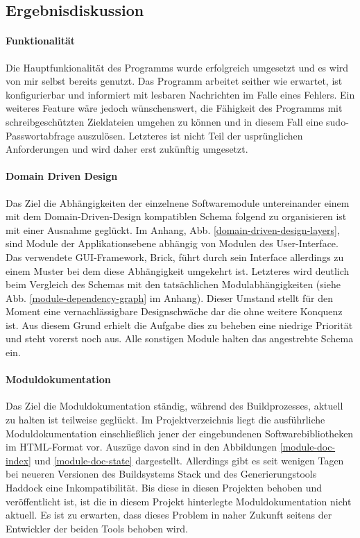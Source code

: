 \subsection{Ergebnisdiskussion}

\paragraph{Funktionalität}
Die Hauptfunkionalität des Programms wurde erfolgreich umgesetzt und es wird von
mir selbst bereits genutzt. Das Programm arbeitet seither wie erwartet,
ist konfigurierbar und informiert mit lesbaren Nachrichten im Falle eines Fehlers.
Ein weiteres Feature wäre jedoch wünschenswert, die Fähigkeit des Programms mit
schreibgeschützten Zieldateien umgehen zu können und in diesem Fall eine
sudo-Passwortabfrage auszulösen. Letzteres ist nicht Teil der
usprünglichen Anforderungen und wird daher erst zukünftig umgesetzt.

\paragraph{Domain Driven Design}
Das Ziel die Abhängigkeiten der einzelnene Softwaremodule untereinander einem
mit dem Domain-Driven-Design kompatiblen Schema folgend zu organisieren ist mit
einer Ausnahme geglückt. Im Anhang, Abb. \ref{domain-driven-design-layers}, sind Module
der Applikationsebene abhängig von Modulen des User-Interface. Das verwendete
\gls{GUI}-Framework, Brick, führt durch sein Interface allerdings zu einem Muster bei
dem diese Abhängigkeit umgekehrt ist. Letzteres wird deutlich beim Vergleich des Schemas mit den
tatsächlichen Modulabhängigkeiten (siehe Abb. \ref{module-dependency-graph} im Anhang).
Dieser Umstand stellt für den Moment eine vernachlässigbare Designschwäche dar die ohne weitere
Konquenz ist. Aus diesem Grund erhielt die Aufgabe dies zu beheben eine niedrige
Priorität und steht vorerst noch aus. Alle sonstigen Module halten das angestrebte
Schema ein.

\paragraph{Moduldokumentation}
Das Ziel die Moduldokumentation ständig, während des Buildprozesses, aktuell zu
halten ist teilweise geglückt. Im Projektverzeichnis liegt die ausführliche Moduldokumentation
einschließlich jener der eingebundenen Softwarebibliotheken im HTML-Format vor.
Auszüge davon sind in den Abbildungen \ref{module-doc-index} und \ref{module-doc-state} dargestellt.
Allerdings gibt es seit wenigen Tagen bei neueren Versionen des Buildsystems Stack \cite{stack}
und des Generierungstools Haddock \cite{haddock} eine Inkompatibilität. Bis diese
in diesen Projekten behoben und veröffentlicht ist, ist die in diesem Projekt hinterlegte
Moduldokumentation nicht aktuell. Es ist zu erwarten, dass dieses Problem in naher
Zukunft seitens der Entwickler der beiden Tools behoben wird.

